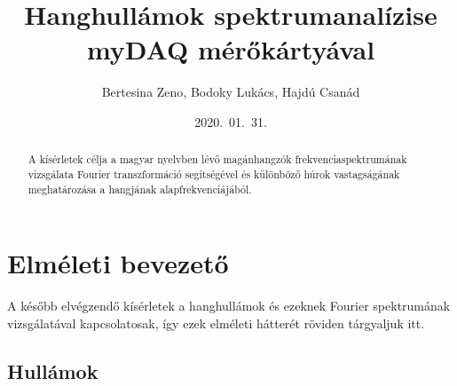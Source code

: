 \documentclass[a4paper,12pt]{article}
\title{\bf Hanghullámok spektrumanalízise myDAQ mérőkártyával}
\author{ {Bertesina Zeno}, {Bodoky Lukács}, {Hajdú Csanád} }
\date{2020.\ 01.\ 31.}
\begin{document}
\maketitle
\thispagestyle{empty}

\renewcommand{\abstractname}{Absztrakt}
\begin{abstract}
\noindent A kísérletek célja a magyar nyelvben lévő magánhangzók frekvenciaspektrumának vizsgálata Fourier transzformáció segítségével és különböző húrok vastagságának meghatározása a hangjának alapfrekvenciájából.
\end{abstract}

\section{Elméleti bevezető}

A később elvégzendő kísérletek a hanghullámok és ezeknek Fourier spektrumának vizsgálatával kapcsolatosak, így ezek elméleti hátterét röviden tárgyaljuk itt.

\subsection{Hullámok}
\end{document}
